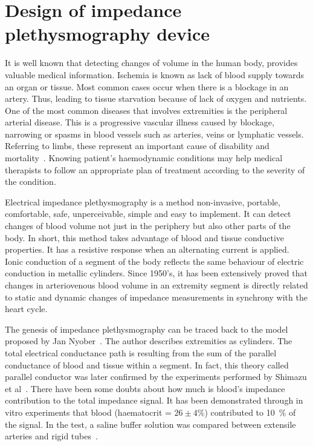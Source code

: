 
\chapter{Design of impedance plethysmography device}

\ifpdf
    \graphicspath{{Chapter3/Figs/Raster/}{Chapter3/Figs/PDF/}{Chapter3/Figs/}}
\else
    \graphicspath{{Chapter3/Figs/Vector/}{Chapter3/Figs/}}
\fi


It is well known that detecting changes of volume in the human body, provides valuable medical information. Ischemia is known as lack of blood supply towards an organ or tissue. Most common cases occur when there is a blockage in an artery. Thus, leading to tissue starvation because of lack of oxygen and nutrients. One of the most common diseases that involves extremities is the peripheral arterial disease. This is a progressive vascular illness caused by blockage, narrowing or spasms in blood vessels such as arteries, veins or lymphatic vessels. Referring to limbs, these represent an important cause of disability and mortality~\cite{novo1995patients}. Knowing patient's haemodynamic conditions may help medical therapists to follow an appropriate plan of treatment according to the severity of the condition.

Electrical impedance plethysmography is a method non-invasive, portable, comfortable, safe, unperceivable, simple and easy to implement.  It can detect changes of blood volume not just in the periphery but also other parts of the body. In short, this method takes advantage of blood and tissue conductive properties. It has a resistive response when an alternating current is applied. Ionic conduction of a segment of the body reflects the same behaviour of electric conduction in metallic cylinders. Since 1950's, it has been extensively proved that changes in arteriovenous blood volume in an extremity segment is directly related to static and dynamic changes of impedance measurements in synchrony with the heart cycle.

The genesis of impedance plethysmography can be traced back to the model proposed by Jan Nyober~\cite{nyober1959electrical}. The author describes extremities as cylinders. The total electrical conductance path is resulting from the sum of the parallel conductance of blood and tissue within a segment. In fact, this theory called parallel conductor was later confirmed by the experiments performed by Shimazu et al~\cite{shimazu1982evaluation}. There have been some doubts about how much is blood's impedance contribution to the total impedance signal.  It has been demonstrated through in vitro experiments that blood (haematocrit = $ 26 \pm 4 \%$) contributed to \SI{10}{\percent} of the signal. In the test, a saline buffer solution was compared between extensile arteries and rigid tubes~\cite{peura1978influence}. 

